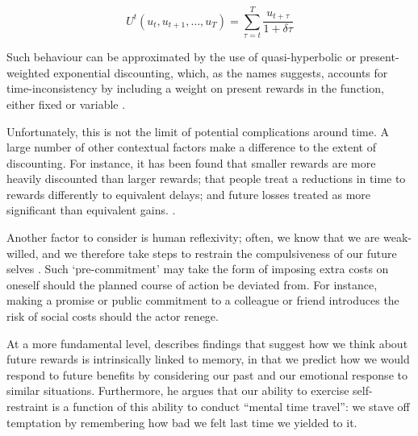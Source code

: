\documentclass{article}
\begin{document}
\[
U^{t}(u_t, u_{t+1},\dots,u_T ) = \sum_{\tau=t}^{T} \frac{ u_{t+\tau}}{1+\delta\tau}
\]



Such behaviour can be approximated by the use of quasi-hyperbolic or present-weighted exponential discounting, which, as the names suggests, accounts for time-inconsistency by including a weight on present rewards in the function, either fixed or variable \citep{Benhabib2010}.

Unfortunately, this is not the limit of potential complications around time. A large number of other contextual factors make a difference to the extent of discounting. For instance, it has been found that smaller rewards are more heavily discounted than larger rewards; that people treat a reductions in time to rewards differently to equivalent delays; and future losses treated as more significant than equivalent gains. \citep{Read2000}.

Another factor to consider is human reflexivity; often, we know that we are weak-willed, and we therefore take steps to restrain the compulsiveness of our future selves \citep{ODonoghue2000}. Such `pre-commitment' may take the form of imposing extra costs on oneself should the planned course of action be deviated from. For instance, making a promise or public commitment to a colleague or friend introduces the risk of social costs should the actor renege.

At a more fundamental level, \citet{Boyer2008} describes findings that suggest how we think about future rewards is intrinsically linked to memory, in that we predict how we would respond to future benefits by considering our past and our emotional response to similar situations. Furthermore, he argues that our ability to exercise self-restraint is a function of this ability to conduct ``mental time travel'': we stave off temptation by remembering how bad we felt last time we yielded to it.
\end{document}
